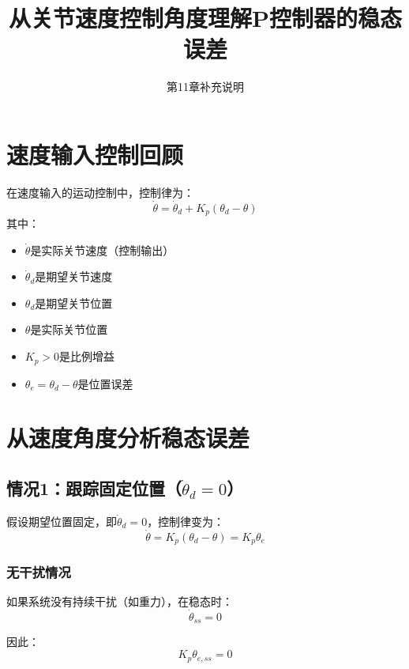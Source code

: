 \documentclass[12pt,a4paper]{article}
\title{从关节速度控制角度理解P控制器的稳态误差}
\author{第11章补充说明}
\date{}
\begin{document}
\maketitle

\section{速度输入控制回顾}

在速度输入的运动控制中，控制律为：
\begin{equation}
\dot{\theta} = \dot{\theta}_d + K_p(\theta_d - \theta)
\end{equation}
其中：
\begin{itemize}
\item $\dot{\theta}$是实际关节速度（控制输出）
\item $\dot{\theta}_d$是期望关节速度
\item $\theta_d$是期望关节位置
\item $\theta$是实际关节位置
\item $K_p > 0$是比例增益
\item $\theta_e = \theta_d - \theta$是位置误差
\end{itemize}

\section{从速度角度分析稳态误差}

\subsection{情况1：跟踪固定位置（$\dot{\theta}_d = 0$）}

假设期望位置固定，即$\dot{\theta}_d = 0$，控制律变为：
\begin{equation}
\dot{\theta} = K_p(\theta_d - \theta) = K_p \theta_e
\end{equation}

\subsubsection{无干扰情况}

如果系统没有持续干扰（如重力），在稳态时：
\begin{equation}
\dot{\theta}_{ss} = 0
\end{equation}

因此：
\begin{equation}
K_p \theta_{e,ss} = 0
\end{equation}
\end{document}
